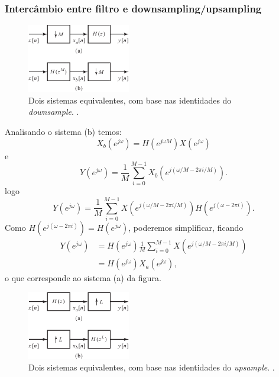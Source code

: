 \begin{frame}[allowframebreaks]
  \frametitle{Intercâmbio entre filtro e downsampling/upsampling}

        \begin{figure}[h!]
        \centering
        \includegraphics[width=0.4\textwidth]{images/fig431.pdf}
        \caption{Dois sistemas equivalentes, com base nas identidades do \textit{downsample}. \citep{oppenheim2009}.}
        \label{fig:fig431}
        \end{figure}

  Analisando o sistema (b) temos:
  \begin{equation}
   X_b(e^{j\omega}) = H(e^{j\omega M}) X(e^{j \omega})
  \end{equation}
  e
  \begin{equation}
   Y(e^{j \omega}) = \frac{1}{M} \sum_{i=0}^{M-1} X_b \left( e^{j (\omega / M - 2\pi i/M)} \right).
  \end{equation}
  logo
  \begin{equation}
   Y(e^{j \omega}) = \frac{1}{M} \sum_{i=0}^{M-1} X\left( e^{j (\omega / M - 2\pi i/M)} \right) H\left( e^{j(\omega - 2\pi i)} \right).
  \end{equation}
  Como $H\left( e^{j(\omega - 2\pi i)} \right) = H(e^{j\omega})$, poderemos simplificar, ficando
  \begin{align}
   Y(e^{j \omega}) &= H(e^{j\omega}) \frac{1}{M} \sum_{i=0}^{M-1} X\left( e^{j (\omega / M - 2\pi i/M)} \right) \\
                &= H(e^{j\omega}) X_a(e^{j\omega}) ,
  \end{align}
  o que corresponde ao sistema (a) da figura.


  \framebreak

        \begin{figure}[h!]
        \centering
        \includegraphics[width=0.4\textwidth]{images/fig432.pdf}
        \caption{Dois sistemas equivalentes, com base nas identidades do \textit{upsample}. \citep{oppenheim2009}.}
        \label{fig:fig432}
        \end{figure}


\end{frame}
